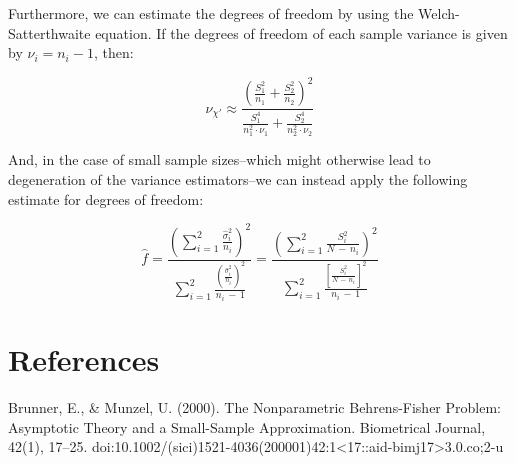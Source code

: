 \documentclass[pdflatex,sn-mathphys-num]{sn-jnl}
\theoremstyle{thmstyleone}
\theoremstyle{thmstyletwo}
\theoremstyle{thmstylethree}
\begin{document}
            \vspace{10pt}

            \noindent Furthermore, we can estimate the degrees of freedom by using the Welch-Satterthwaite equation. If the degrees of freedom of each sample variance is given by $\nu_{i} = n_{i} - 1$, then:

            \begin{equation}
                \nu_{\chi'} \approx \frac{\left( \frac{S_{1}^{2}}{n_{1}} + \frac{S_{2}^{2}}{n_{2}}\right)^{2}}{\frac{S_{1}^{4}}{n_{1}^{2} \cdot \nu_{1}} + \frac{S_{2}^{4}}{n_{2}^{2} \cdot \nu_{2}}}
            \end{equation}

            \vspace{10pt}

            \noindent And, in the case of small sample sizes--which might otherwise lead to degeneration of the variance estimators--we can instead apply the following estimate for degrees of freedom:

            \begin{equation}
                \hat{f} = \frac{\left( \sum_{i=1}^{2} \frac{\hat{\sigma}_{i}^{2}}{n_{i}} \right)^{2}}{\sum_{i=1}^{2} \frac{\left( \frac{\hat{\sigma}_{i}^{2}}{n_{i}} \right)^{2}}{n_{i} \, - \, 1}} = \frac{\left( \sum_{i=1}^{2} \frac{S_{i}^{2}}{N \, - \, n_{i}} \right)^{2}}{\sum_{i=1}^{2} \frac{\left[ \frac{S_{i}^{2}}{N \, - \, n_{i}} \right]^{2}}{n_{i} \, - \, 1}}
            \end{equation}

        \vspace{10pt}

    \newpage

    \section{References}

    Brunner, E., \& Munzel, U. (2000). The Nonparametric Behrens-Fisher Problem: Asymptotic Theory and a Small-Sample Approximation. Biometrical Journal, 42(1), 17–25. doi:10.1002/(sici)1521-4036(200001)42:1<17::aid-bimj17>3.0.co;2-u 
\end{document}
